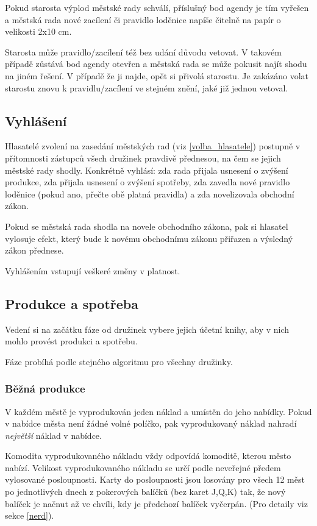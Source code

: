 \documentclass[a4paper, 12pt, twoside]{article}
\begin{document}
Pokud starosta výplod městské rady schválí, příslušný bod agendy je tím vyřešen a městská rada nové zacílení či pravidlo loděnice napíše čitelně na papír o velikosti 2x10 cm.

Starosta může pravidlo/zacílení též bez udání důvodu vetovat.  V takovém případě zůstává bod agendy otevřen a městská rada se může pokusit najít shodu na
jiném řešení.  V případě že ji najde, opět si přivolá starostu.  Je zakázáno volat starostu znovu k pravidlu/zacílení ve stejném znění, jaké již jednou vetoval.


\subsection{Vyhlášení}
\label{vyhlaseni}

Hlasatelé zvolení na zasedání městských rad (viz \ref{volba_hlasatele}) postupně v přítomnosti zástupců všech družinek pravdivě přednesou, na čem se 
jejich městské rady shodly.  Konkrétně vyhlásí:  zda rada přijala usnesení o zvýšení produkce, zda přijala usnesení o zvýšení spotřeby, 
zda zavedla nové pravidlo loděnice (pokud ano, přečte obě platná pravidla) a zda novelizovala obchodní zákon.

Pokud se městská rada shodla na novele obchodního zákona, pak si hlasatel vylosuje efekt, který bude k novému obchodnímu zákonu přiřazen a výsledný zákon
přednese.

Vyhlášením vstupují veškeré změny v platnost.

\subsection{Produkce a spotřeba}
\label{produkce_a_spotreba}

Vedení si na začátku fáze od družinek vybere jejich účetní knihy, aby v nich mohlo provést produkci a spotřebu.

Fáze probíhá podle stejného algoritmu pro všechny družinky.


\subsubsection{Běžná produkce}

V každém městě je vyprodukován jeden náklad a umístěn do jeho nabídky.  Pokud v nabídce města není žádné volné políčko, pak vyprodukovaný náklad nahradí
\emph{největší} náklad v nabídce.

Komodita vyprodukovaného nákladu vždy odpovídá komoditě, kterou město nabízí.  Velikost vyprodukovaného nákladu se určí podle neveřejné předem vylosované
posloupnosti.  Karty do posloupnosti jsou losovány pro všech 12 měst po jednotlivých dnech z pokerových balíčků (bez karet J,Q,K) tak, že nový balíček
je načnut až ve chvíli, kdy je předchozí balíček vyčerpán.  (Pro detaily viz sekce \ref{nerd}).
\end{document}
